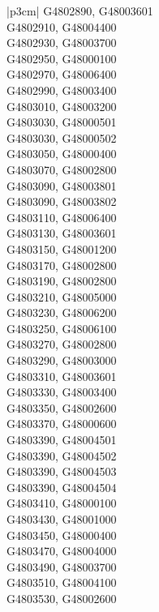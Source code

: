 \begin{customLongTable}{ |p{3cm}| }
G4802890, G48003601 \\ \hline
G4802910, G48004400 \\ \hline
G4802930, G48003700 \\ \hline
G4802950, G48000100 \\ \hline
G4802970, G48006400 \\ \hline
G4802990, G48003400 \\ \hline
G4803010, G48003200 \\ \hline
G4803030, G48000501 \\ \hline
G4803030, G48000502 \\ \hline
G4803050, G48000400 \\ \hline
G4803070, G48002800 \\ \hline
G4803090, G48003801 \\ \hline
G4803090, G48003802 \\ \hline
G4803110, G48006400 \\ \hline
G4803130, G48003601 \\ \hline
G4803150, G48001200 \\ \hline
G4803170, G48002800 \\ \hline
G4803190, G48002800 \\ \hline
G4803210, G48005000 \\ \hline
G4803230, G48006200 \\ \hline
G4803250, G48006100 \\ \hline
G4803270, G48002800 \\ \hline
G4803290, G48003000 \\ \hline
G4803310, G48003601 \\ \hline
G4803330, G48003400 \\ \hline
G4803350, G48002600 \\ \hline
G4803370, G48000600 \\ \hline
G4803390, G48004501 \\ \hline
G4803390, G48004502 \\ \hline
G4803390, G48004503 \\ \hline
G4803390, G48004504 \\ \hline
G4803410, G48000100 \\ \hline
G4803430, G48001000 \\ \hline
G4803450, G48000400 \\ \hline
G4803470, G48004000 \\ \hline
G4803490, G48003700 \\ \hline
G4803510, G48004100 \\ \hline
G4803530, G48002600 \\ \hline

\end{customLongTable}
